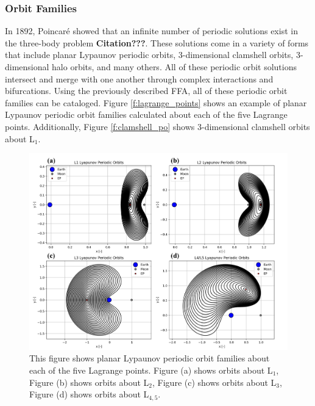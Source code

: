 \documentclass[11pt]{article} %
\begin{document}
\subsubsection{Orbit Families}
In 1892, Poincar\'{e} showed that an infinite number of periodic solutions exist in the three-body problem \color{red}\textbf{Citation???}\color{black}. These solutions come in a variety of forms that include planar Lypaunov periodic orbits, 3-dimensional clamshell orbits, 3-dimensional halo orbits, and many others. All of these periodic orbit solutions intersect and merge with one another through complex interactions and bifurcations. Using the previously described FFA, all of these periodic orbit families can be cataloged. Figure \ref{f:lagrange_points} shows an example of planar Lypaunov periodic orbit families calculated about each of the five Lagrange points. Additionally, Figure \ref{f:clamshell_po} shows 3-dimensional clamshell orbits about L$_1$. 

\begin{figure}[H]
    \centering
    \includegraphics[width=\textwidth]{lyapunov_po_comb.png}
    \caption{This figure shows planar Lypaunov periodic orbit families about each of the five Lagrange points. Figure (a) shows orbits about L$_1$, Figure (b) shows orbits about L$_2$, Figure (c) shows orbits about L$_3$, Figure (d) shows orbits about L$_{4,5}$.}
    \label{f:lyapunov_po}
\end{figure}
\end{document}
